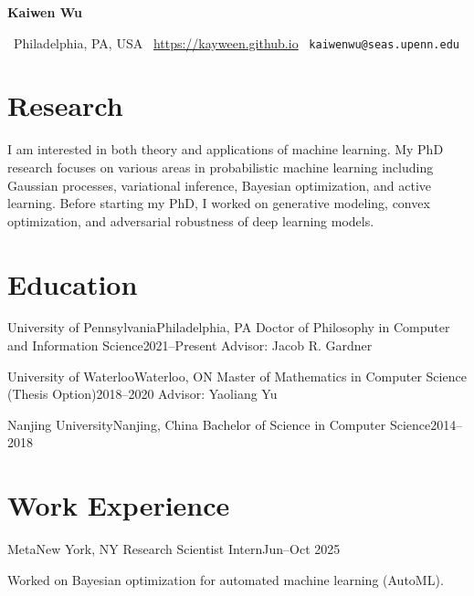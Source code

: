 \documentclass{article}
\begin{document}
\begin{center}
  \color{Mahogany}\Huge\bf
  Kaiwen Wu
\end{center}
%
\faMapMarker \, Philadelphia, PA, USA
\hfill
\faGlobe \, \url{https://kayween.github.io}
\hfill
\faEnvelope \, \texttt{kaiwenwu@seas.upenn.edu}
\par

\section{Research}
I am interested in both theory and applications of machine learning.
My PhD research focuses on various areas in probabilistic machine learning including Gaussian processes, variational inference, Bayesian optimization, and active learning.
Before starting my PhD, I worked on generative modeling, convex optimization, and adversarial robustness of deep learning models.

\section{Education}
\begin{education}[]
  {University of Pennsylvania}{Philadelphia, PA}
  {Doctor of Philosophy in Computer and Information Science}{2021--Present}
  Advisor: Jacob R. Gardner
\end{education}

\begin{education}
  {University of Waterloo}{Waterloo, ON}
  {Master of Mathematics in Computer Science (Thesis Option)}{2018--2020}
  Advisor: Yaoliang Yu
\end{education}

\begin{education}
  {Nanjing University}{Nanjing, China}
  {Bachelor of Science in Computer Science}{2014--2018}
\end{education}

\section{Work Experience}
\begin{work}[]
  {Meta}{New York, NY}
  {Research Scientist Intern}{Jun--Oct 2025}
  \begin{compactList}
  \item Worked on Bayesian optimization for automated machine learning (AutoML).
  \end{compactList}
\end{work}
\end{document}
